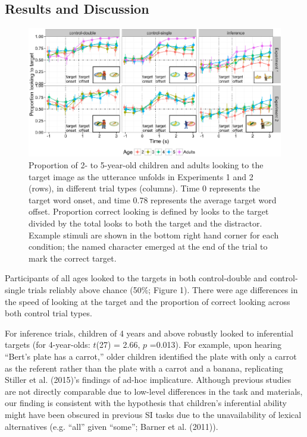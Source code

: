 \documentclass[a4paper,man,apacite,floatsintext]{apa6}
\newenvironment{CodeChunk}{}{}
\begin{document}
\subsection{Results and Discussion}\label{results-and-discussion}

\begin{CodeChunk}
\begin{figure}[H]

{\centering \includegraphics{figs/et_acc-1} 

}

\caption[Proportion of 2- to 5-year-old children and adults looking to the target image as the utterance unfolds in Experiments 1 and 2 (rows), in different trial types (columns)]{Proportion of 2- to 5-year-old children and adults looking to the target image as the utterance unfolds in Experiments 1 and 2 (rows), in different trial types (columns). Time 0 represents the target word onset, and time 0.78 represents the average target word offset. Proportion correct looking is defined by looks to the target divided by the total looks to both the target and the distractor. Example stimuli are shown in the bottom right hand corner for each condition; the named character emerged at the end of the trial to mark the correct target.}\label{fig:et_acc}
\end{figure}
\end{CodeChunk}

Participants of all ages looked to the targets in both control-double
and control-single trials reliably above chance (50\%; Figure 1). There
were age differences in the speed of looking at the target and the
proportion of correct looking across both control trial types.

For inference trials, children of 4 years and above robustly looked to
inferential targets (for 4-year-olds: \(t\)(27) = 2.66, \(p\) =0.013).
For example, upon hearing ``Bert's plate has a carrot,'' older children
identified the plate with only a carrot as the referent rather than the
plate with a carrot and a banana, replicating Stiller et al. (2015)'s
findings of ad-hoc implicature. Although previous studies are not
directly comparable due to low-level differences in the task and
materials, our finding is consistent with the hypothesis that children's
inferential ability might have been obscured in previous SI tasks due to
the unavailability of lexical alternatives (e.g. ``all'' given ``some'';
Barner et al. (2011)).
\end{document}
